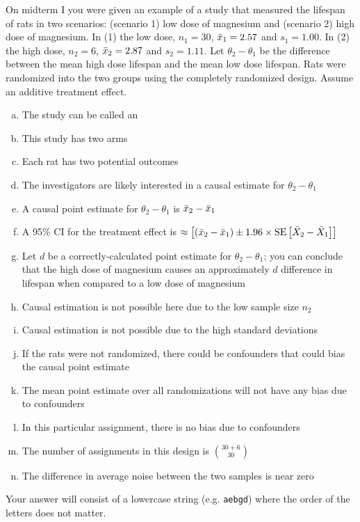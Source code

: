 \documentclass[12pt,landscape]{article}
\newcommand{\instr}{\small Your answer will consist of a lowercase string (e.g. \texttt{aebgd}) where the order of the letters does not matter. \normalsize}
\begin{document}
\problem{} On midterm I you were given an example of a study that measured the lifespan of rats in two scenarios: (scenario 1) low dose of magnesium and (scenario 2) high dose of magnesium. In (1) the low dose, $n_1=30$, $\bar{x}_1 = 2.57$ and $s_1 = 1.00$. In (2) the high dose, $n_2=6$, $\bar{x}_2 = 2.87$ and $s_2 = 1.11$. Let $\theta_2 - \theta_1$ be the difference between the mean high dose lifespan and the mean low dose lifespan. Rats were randomized into the two groups using the completely randomized design. Assume an additive treatment effect.

\vspace{-0.2cm}\benum{} 

\begin{enumerate}[(a)]
\item The study can be called an 
\item This study has two arms
\item Each rat has two potential outcomes
\item The investigators are likely interested in a causal estimate for $\theta_2 - \theta_1$
\item A causal point estimate for $\theta_2 - \theta_1$ is $\bar{x}_2 - \bar{x}_1$
\item A 95\% CI for the treatment effect is $\approx \left[(\bar{x}_2 - \bar{x}_1) \pm 1.96 \times \text{SE}\left[\bar{X}_2 - \bar{X}_1\right]\right]$
\item Let $d$ be a correctly-calculated point estimate for $\theta_2 - \theta_1$; you can conclude that the high dose of magnesium causes an approximately $d$ difference in lifespan when compared to a low dose of magnesium
\item Causal estimation is not possible here due to the low sample size $n_2$
\item Causal estimation is not possible due to the high standard deviations
\item If the rats were not randomized, there could be confounders that could bias the causal point estimate
\item The mean point estimate over all randomizations will not have any bias due to confounders
\item In this particular assignment, there is no bias due to confounders
\item The number of assignments in this design is $\binom{30+6}{30}$
\item The difference in average noise between the two samples is near zero
\end{enumerate}
\eenum\instr\pagebreak
\end{document}
